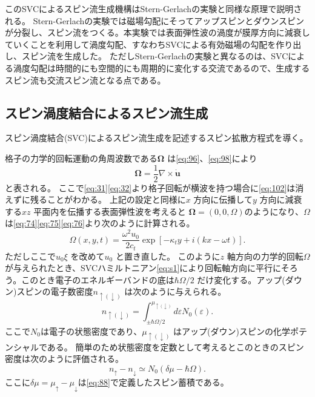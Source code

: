 \documentclass[dvipdfmx]{jsreport}
\numberwithin{equation}{chapter}
\numberwithin{table}{chapter}
\begin{document}
このSVCによるスピン流生成機構はStern-Gerlachの実験と同様な原理で説明される。
Stern-Gerlachの実験では磁場勾配にそってアップスピンとダウンスピンが分裂し、スピン流をつくる。本実験では表面弾性波の渦度が膜厚方向に減衰していくことを利用して渦度勾配、すなわちSVCによる有効磁場の勾配を作り出し、スピン流を生成した。
ただしStern-Gerlachの実験と異なるのは、SVCによる渦度勾配は時間的にも空間的にも周期的に変化する交流であるので、生成するスピン流も交流スピン流となる点である。
\subsection{スピン渦度結合によるスピン流生成}
\label{sec224}
スピン渦度結合(SVC)によるスピン流生成を記述するスピン拡散方程式を導く。

格子の力学的回転運動の角周波数である$\bm{\Omega}$ は\eqref{eq:96}、\eqref{eq:98}により
\begin{equation}
\label{eq:102}
	\bm{\Omega}=\frac{1}{2} \nabla \times \dot{\bm{u}}
\end{equation}
と表される。
ここで\eqref{eq:31}\eqref{eq:32}より格子回転が横波を持つ場合に\eqref{eq:102}は消えずに残ることがわかる。
上記の設定と同様に$x$ 方向に伝播して$y$ 方向に減衰する$xz$ 平面内を伝播する表面弾性波を考えると
$\bm{\Omega}=(0,0,\Omega)$のようになり、$\Omega$ は\eqref{eq:74}\eqref{eq:75}\eqref{eq:76}より次のように計算される。
\begin{equation}
\label{eq:103}
	\Omega(x,y,t)=\frac{\omega^2u_0}{2c_t}\exp \left[ -\kappa_t y+i(kx-\omega t) \right] 
.\end{equation}
ただしここで$u_0 \xi$ を改めて$u_0$ と置き直した。
このように$z$ 軸方向の力学的回転$\Omega$が与えられたとき、SVCハミルトニアン\eqref{eq:s1}により回転軸方向に平行にそろう。このとき電子のエネルギーバンドの底は$\hbar \Omega /2$ だけ変化する。アップ(ダウン)スピンの電子数密度$n_{\uparrow(\downarrow)}$
は次のように与えられる。
\begin{equation}
\label{eq:104}
	n_{\uparrow(\downarrow)}=\int_{\pm \hbar \Omega /2}^{\mu_{\uparrow(\downarrow)}} d\varepsilon N_0(\varepsilon)
.\end{equation}
ここで$ N_0$は電子の状態密度であり、$\mu_{\uparrow(\downarrow)}$ はアップ(ダウン)スピンの化学ポテンシャルである。
簡単のため状態密度を定数として考えるとこのときのスピン密度は次のように評価される。
\begin{equation}
\label{eq:105}
	n_{\uparrow}-n_{\downarrow}\simeq N_0(\delta\mu-\hbar \Omega)
.\end{equation}
ここに$\delta\mu=\mu_{\uparrow}-\mu_{\downarrow}$は\eqref{eq:88}で定義したスピン蓄積である。
\end{document}
